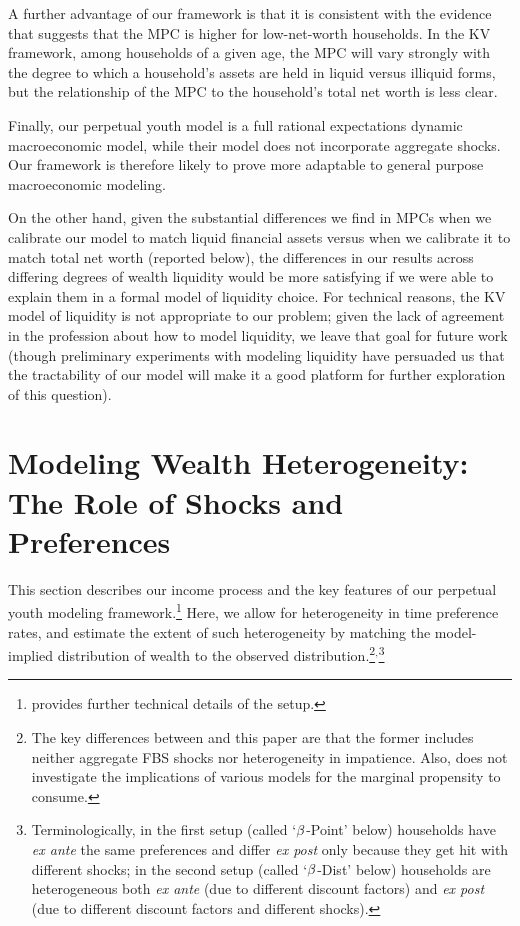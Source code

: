 \documentclass[12pt,titlepage]{econtex}
\begin{document}
A further advantage of our framework is that it is consistent with the
evidence that suggests that the MPC is higher for low-net-worth
households.  In the KV framework, among households of a given age, the
MPC will vary strongly with the degree to which a household's assets
are held in liquid versus illiquid forms, but the relationship of the
MPC to the household's total net worth is less clear.

Finally, our perpetual youth model is a full rational expectations dynamic
macroeconomic model, while their model does not incorporate aggregate
shocks.  Our framework is therefore likely to prove more adaptable to
general purpose macroeconomic modeling.

On the other hand, given the substantial differences we find in MPCs
when we calibrate our model to match liquid financial assets versus
when we calibrate it to match total net worth (reported below), the
differences in our results across differing degrees of wealth
liquidity would be more satisfying if we were able to explain them in
a formal model of liquidity choice.  For technical reasons, the KV model of liquidity is not appropriate to our
problem; given the lack of agreement in the profession about how to
model liquidity, we leave that goal for future work (though
preliminary experiments with modeling liquidity have persuaded us that
the tractability of our model will make it a good platform for further
exploration of this question).



\section{Modeling Wealth Heterogeneity: The Role of Shocks and Preferences}\label{sec:Model}

This section describes our income process and the key features of our perpetual youth modeling framework.\footnote{\citet{cstKS} provides further technical details of
the setup.}  Here, we allow for
heterogeneity in time preference rates, and estimate the extent of
such heterogeneity by matching the model-implied distribution of
wealth to the observed distribution.\footnote{The key
  differences between \citet{cstKS} and this paper are that the former
  includes neither aggregate FBS shocks nor heterogeneity in
  impatience. Also, \citet{cstKS} does not investigate the
  implications of various models for the marginal propensity to
  consume.}${}^{, }$\footnote{Terminologically, in the first setup (called
  `$\beta$-Point' below) households have {\it ex ante} the same
  preferences and differ {\it ex post} only because they get hit with
  different shocks; in the second setup (called `$\beta$-Dist'
  below) households are heterogeneous both {\it ex ante} (due to different
  discount factors) and {\it ex post} (due to different discount factors and
  different shocks).  }
\end{document}
